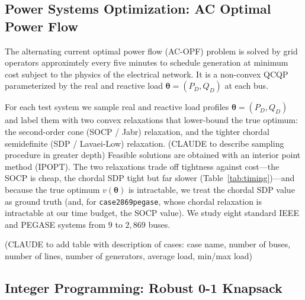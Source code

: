 \documentclass[10pt]{article} %
\theoremstyle{plain}
\theoremstyle{definition}
\theoremstyle{remark}
\begin{document}
\subsection{Power Systems Optimization: AC Optimal Power Flow}

The alternating current optimal power flow (AC-OPF) problem is solved by grid operators approximtely every five minutes to schedule generation at minimum cost subject to the physics of the electrical network.
It is a non-convex QCQP parameterized by the real and reactive load $\bm{\theta} = (P_D, Q_D)$ at each bus.


For each test system we sample real and reactive load profiles $\bm{\theta} = (P_D, Q_D)$ and label them with two convex relaxations that lower-bound the true optimum: the second-order cone (SOCP / Jabr) relaxation, and the tighter chordal semidefinite (SDP / Lavaei-Low) relaxation.
(CLAUDE to describe sampling procedure in greater depth)
Feasible solutions are obtained with an interior point method (IPOPT). The two relaxations trade off tightness against cost---the SOCP is cheap, the chordal SDP tight but far slower (Table~\ref{tab:timing})---and because the true optimum $v(\bm{\theta})$ is intractable, we treat the chordal SDP value as ground truth (and, for \texttt{case2869pegase}, whose chordal relaxation is intractable at our time budget, the SOCP value). We study eight standard IEEE and PEGASE systems from $9$ to $2{,}869$ buses.

(CLAUDE to add table with description of cases: case name, number of buses, number of lines, number of generators, average load, min/max load)

\subsection{Integer Programming: Robust 0-1 Knapsack}
\end{document}
